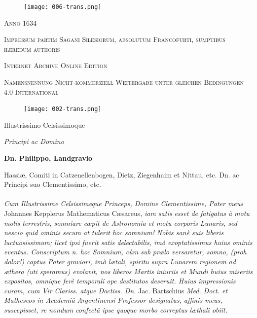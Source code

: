 \documentclass[a4paper, 11pt, oneside, polutonikogreek, german]{article}
\begin{document}
\begin{titlepage}
        \vspace*{\fill}

        \begin{figure}[H]
        \centering
        \texttt{[image: 006-trans.png]}
        \end{figure}

	\vspace{1\baselineskip}

	{\small\scshape Anno 1634}
	
	{\small\scshape{Impressum partim Sagani Silesiorum, absolutum Francofurti, sumptibus hæredum authoris}}
	
	\vspace{0.5\baselineskip} %

        \scshape Internet Archive Online Edition%
    
	{\scshape\small Namensnennung Nicht-kommerziell Weitergabe unter gleichen Bedingungen 4.0 International} %
\end{titlepage}
\setlength{\parskip}{1mm plus1mm minus1mm}
\clearpage
\begin{figure}[H]
\centering
\texttt{[image: 002-trans.png]}
\end{figure}
\begin{center}
Illustrissimo Celsissimoque

\emph{Principi ac Domino}

\textbf{Dn. Philippo, Landgravio}

{\small Hassiæ, Comiti in Catzenellenbogen, Dietz, Ziegenhaim et Nittau, etc. Dn. ac Principi suo Clementissimo, etc.}
\end{center}
\paragraph{}
\emph{Cum Illustrissime Celsissimeque Princeps, Domine Clementissime, Pater meus} Johannes Kepplerus Mathematicus Cæsareus, \emph{iam satis esset de fatigatus à motu molis terrestris, somniare cœpit de Astronomia et motu corporis Lunaris, sed nescio quid ominis secum at tulerit hoc somnium! Nobis sanè suis liberis luctuosissimum; licet ipsi fuerit satis delectabilis, imò exoptatissimus huius ominis eventus. Conscriptum n. hoc Somnium, cùm sub prælo versaretur, somno, (proh dolor!) captus Pater graviori, imò lætali, spiritu supra Lunarem regionem ad æthera (uti speramus) evolavit, nos liberos Martis iniuriis et Mundi huius miseriis expositos, omnique ferè temporali ope destitutos deseruit. Huius impressionis curam, cum Vir Clariss. atque Doctiss. Dn.} Jac. Bartschius \emph{Med. Doct. et Matheseos in Academiâ Argentinensi Professor designatus, affinis meus, suscepisset, re nondum confectâ ipse quoque morbo correptus læthali obiit.}
\end{document}
